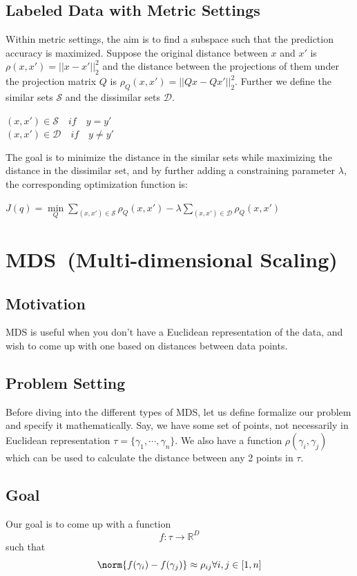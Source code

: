 \subsection{Labeled Data with Metric Settings}
Within metric settings, the aim is to find a subspace such that the prediction accuracy is maximized. Suppose the original distance between $x$ and $x'$ is $\rho(x,x') = ||x-x'||_{2}^{2}$ and the distance between the projections of them under the projection matrix $Q$ is $\rho_{Q}(x,x') = ||Qx-Qx'||_{2}^{2}$. Further we define the similar sets $\mathcal{S}$ and the dissimilar sets $\mathcal{D}$.
\begin{center}
	$(x,x') \in \mathcal{S} \quad if \quad y=y'$\\
	$(x,x') \in \mathcal{D} \quad if \quad y \neq y'$
\end{center}
The goal is to minimize the distance in the similar sets while maximizing the distance in the dissimilar set, and by further adding a constraining parameter $\lambda$, the corresponding optimization function is:
\begin{center}
	$J(q) = \min\limits_{Q} \sum\limits_{(x,x') \in \mathcal{S}}\rho_{Q}(x,x') - \lambda  \sum\limits_{(x,x') \in \mathcal{D
	}}\rho_{Q}(x,x')$
\end{center}

\section{MDS~(Multi-dimensional Scaling)}
\subsection{Motivation} MDS is useful when you don't have a Euclidean representation of the
data, and wish to come up with one based on distances between data
points.\\
\subsection{Problem Setting} Before diving into the different types of MDS, let us define formalize our problem and specify it mathematically. Say, we have some set of points, not necessarily in Euclidean representation $\tau = \{\gamma_1, \cdots, \gamma_n\}$. We also have a function $\rho(\gamma_i, \gamma_j)$ which can be used to calculate the distance between any 2 points in $\tau$.
\subsection{Goal} Our goal is to come up with a function $$f: \tau  \rightarrow \mathbb{R}^D$$ such that $$\norm{f(\gamma_i) - f(\gamma_j)} \approx \rho_{ij} \forall i,j \in [1,n]$$  

